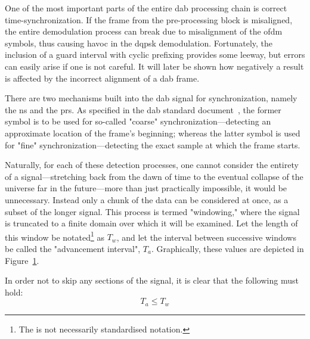 \documentclass[class=report,11pt,crop=false]{standalone}
\begin{document}
One of the most important parts of the entire \gls{dab} processing chain is correct time-synchronization. If the frame from the pre-processing block is misaligned, the entire demodulation process can break due to misalignment of the \gls{ofdm} symbols, thus causing havoc in the \gls{dqpsk} demodulation. Fortunately, the inclusion of a guard interval with cyclic prefixing provides some leeway, but errors can easily arise if one is not careful. It will later be shown how negatively a result is affected by the incorrect alignment of a \gls{dab} frame.

There are two mechanisms built into the \gls{dab} signal for synchronization, namely the \acrfull{ns} and the \acrfull{prs}. As specified in the \gls{dab} standard document~\cite{dabstandard}, the former symbol is to be used for so-called "coarse" synchronization---detecting an approximate location of the frame's beginning; whereas the latter symbol is used for "fine" synchronization---detecting the exact sample at which the frame starts. 

Naturally, for each of these detection processes, one cannot consider the entirety of a signal---stretching back from the dawn of time to the eventual collapse of the universe far in the future---more than just practically impossible, it would be unnecessary. Instead only a chunk of the data can be considered at once, as a subset of the longer signal. This process is termed "windowing," where the signal is truncated to a finite domain over which it will be examined. Let the length of this window be notated\footnote{The is not necessarily standardised notation.} as \(T_w\), and let the interval between successive windows be called the "advancement interval", \(T_a\). Graphically, these values are depicted in Figure~\ref{fig:window_advance_illustration}.

\begin{figure}[htbp]
  \centering
  \captionsetup{type=figure}
  \def\svgwidth{\linewidth}
  { %
      }
      \caption{}
      \label{fig:window_advance_illustration}
\end{figure}

In order not to skip any sections of the signal, it is clear that the following must hold:
\begin{equation}
  T_a \le T_w
\end{equation}
\end{document}
